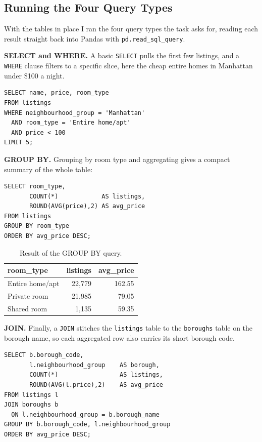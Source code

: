 \documentclass[11pt,a4paper]{article}
\begin{document}
\subsection*{Running the Four Query Types}
With the tables in place I ran the four query types the task asks for, reading each result straight back into Pandas with \texttt{pd.read\_sql\_query}.

\textbf{SELECT and WHERE.} A basic \texttt{SELECT} pulls the first few listings, and a \texttt{WHERE} clause filters to a specific slice, here the cheap entire homes in Manhattan under \$100 a night.

\begin{lstlisting}[style=sql, caption={A filtered query.}]
SELECT name, price, room_type
FROM listings
WHERE neighbourhood_group = 'Manhattan'
  AND room_type = 'Entire home/apt'
  AND price < 100
LIMIT 5;
\end{lstlisting}

\textbf{GROUP BY.} Grouping by room type and aggregating gives a compact summary of the whole table:

\begin{lstlisting}[style=sql, caption={Aggregating with GROUP BY.}]
SELECT room_type,
       COUNT(*)            AS listings,
       ROUND(AVG(price),2) AS avg_price
FROM listings
GROUP BY room_type
ORDER BY avg_price DESC;
\end{lstlisting}

\begin{table}[H]
\centering
\begin{tabular}{lrr}
\toprule
\textbf{room\_type} & \textbf{listings} & \textbf{avg\_price} \\
\midrule
Entire home/apt & 22{,}779 & 162.55 \\
Private room    & 21{,}985 & 79.05 \\
Shared room     & 1{,}135  & 59.35 \\
\bottomrule
\end{tabular}
\caption{Result of the GROUP BY query.}
\end{table}

\textbf{JOIN.} Finally, a \texttt{JOIN} stitches the \texttt{listings} table to the \texttt{boroughs} table on the borough name, so each aggregated row also carries its short borough code.

\begin{lstlisting}[style=sql, caption={Joining the two tables.}]
SELECT b.borough_code,
       l.neighbourhood_group    AS borough,
       COUNT(*)                 AS listings,
       ROUND(AVG(l.price),2)    AS avg_price
FROM listings l
JOIN boroughs b
  ON l.neighbourhood_group = b.borough_name
GROUP BY b.borough_code, l.neighbourhood_group
ORDER BY avg_price DESC;
\end{lstlisting}
\end{document}
